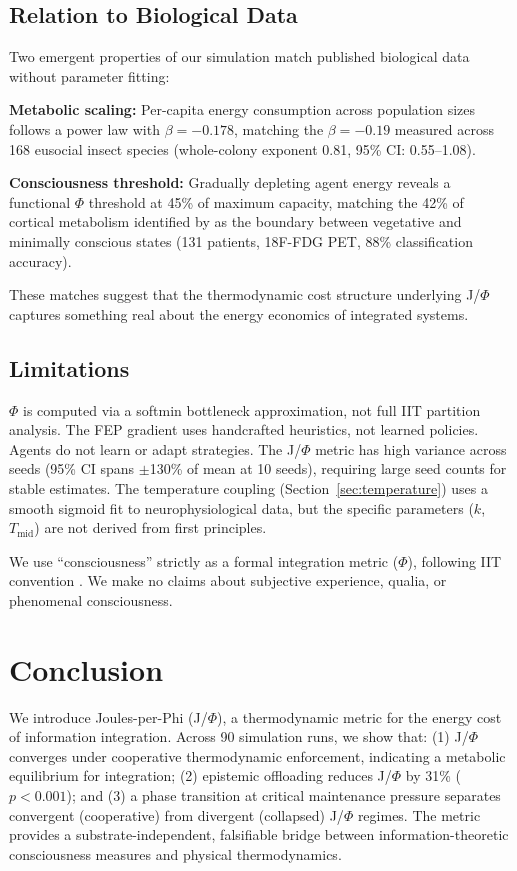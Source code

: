 \documentclass[entropy,article]{Definitions/mdpi}
\begin{document}
\subsection{Relation to Biological Data}

Two emergent properties of our simulation match published biological data without parameter fitting:

\textbf{Metabolic scaling:} Per-capita energy consumption across population sizes follows a power law with $\beta = -0.178$, matching the $\beta = -0.19$ measured across 168 eusocial insect species \citep{hou2010} (whole-colony exponent 0.81, 95\% CI: 0.55--1.08).

\textbf{Consciousness threshold:} Gradually depleting agent energy reveals a functional $\Phi$ threshold at 45\% of maximum capacity, matching the 42\% of cortical metabolism identified by \citet{stender2015} as the boundary between vegetative and minimally conscious states (131 patients, 18F-FDG PET, 88\% classification accuracy).

These matches suggest that the thermodynamic cost structure underlying J/$\Phi$ captures something real about the energy economics of integrated systems.

\subsection{Limitations}

$\Phi$ is computed via a softmin bottleneck approximation, not full IIT partition analysis. The FEP gradient uses handcrafted heuristics, not learned policies. Agents do not learn or adapt strategies. The J/$\Phi$ metric has high variance across seeds (95\% CI spans $\pm$130\% of mean at 10 seeds), requiring large seed counts for stable estimates. The temperature coupling (Section~\ref{sec:temperature}) uses a smooth sigmoid fit to neurophysiological data, but the specific parameters ($k$, $T_{\text{mid}}$) are not derived from first principles.

We use ``consciousness'' strictly as a formal integration metric ($\Phi$), following IIT convention \citep{tononi2004}. We make no claims about subjective experience, qualia, or phenomenal consciousness.

\section{Conclusion}
\label{sec:conclusion}

We introduce Joules-per-Phi (J/$\Phi$), a thermodynamic metric for the energy cost of information integration. Across 90 simulation runs, we show that: (1) J/$\Phi$ converges under cooperative thermodynamic enforcement, indicating a metabolic equilibrium for integration; (2) epistemic offloading reduces J/$\Phi$ by 31\% ($p < 0.001$); and (3) a phase transition at critical maintenance pressure separates convergent (cooperative) from divergent (collapsed) J/$\Phi$ regimes. The metric provides a substrate-independent, falsifiable bridge between information-theoretic consciousness measures and physical thermodynamics.
\end{document}
